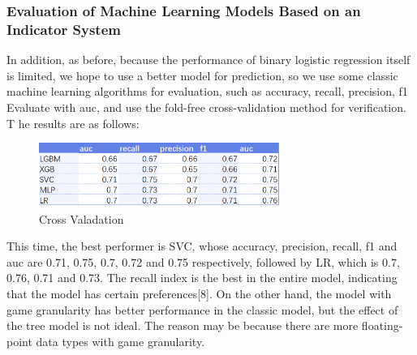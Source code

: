 \documentclass[12pt]{article}
\begin{document}
\subsubsection{Evaluation of Machine Learning Models Based on an Indicator System}
In addition, as before, because the performance of binary logistic regression itself is limited, we hope to use a better model for prediction,
so we use some classic machine learning algorithms for evaluation, such as accuracy, recall, precision, f1 Evaluate with auc, and use the fold-free cross-validation method for verification. T he results are as follows:
\begin{figure}[H]
      \centering
      \includegraphics[width=0.7\textwidth]{crossValidation2.png}
      \caption{Cross Valadation}
\end{figure}

This time, the best performer is SVC, whose accuracy, precision, recall, f1 and auc are 0.71, 0.75, 0.7, 0.72 and 0.75 respectively,
followed by LR, which is 0.7, 0.76, 0.71 and 0.73. The recall index is the best in the entire model, indicating that the model has certain preferences[8]. On the other hand, the model
with game granularity has better performance in the classic model, but the effect of the tree model is not ideal. The reason may be because there are more floating-point data types with game granularity.
\end{document}

